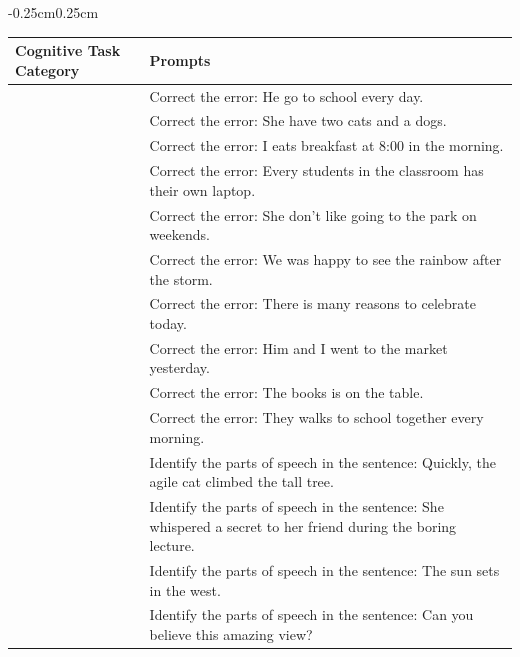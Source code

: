 \documentclass[11pt,a4paper]{ouparticle}
\begin{document}
\begin{table}[!ht]
    \begin{adjustwidth}{-0.25cm}{0.25cm}  %
    \centering
    \begin{tabular}{>{\centering\arraybackslash}p{2.5cm} >{\centering\arraybackslash}p{13.5cm}}
        \toprule
        \textbf{Cognitive Task Category} & \textbf{Prompts} \\
        \midrule
        \multirow{10}{=}{\textbf{Syntax and Grammar Correction}} & Correct the error: He go to school every day. \\
                                      & Correct the error: She have two cats and a dogs. \\
                                      & Correct the error: I eats breakfast at 8:00 in the morning. \\
                                      & Correct the error: Every students in the classroom has their own laptop. \\
                                      & Correct the error: She don't like going to the park on weekends. \\
                                      & Correct the error: We was happy to see the rainbow after the storm. \\
                                      & Correct the error: There is many reasons to celebrate today. \\
                                      & Correct the error: Him and I went to the market yesterday. \\
                                      & Correct the error: The books is on the table. \\
                                      & Correct the error: They walks to school together every morning. \\
        \midrule
        \multirow{10}{=}{\textbf{Part of Speech Tagging}} & Identify the parts of speech in the sentence: Quickly, the agile cat climbed the tall tree. \\
                               & Identify the parts of speech in the sentence: She whispered a secret to her friend during the boring lecture. \\
                               & Identify the parts of speech in the sentence: The sun sets in the west. \\
                               & Identify the parts of speech in the sentence: Can you believe this amazing view? \\

\end{tabular}
\end{adjustwidth}
\end{table}
\end{document}
